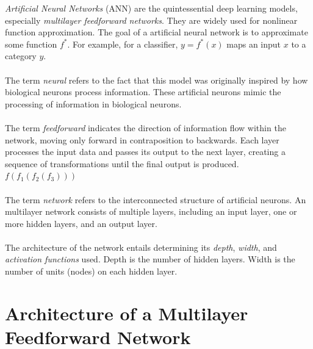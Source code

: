 \documentclass[../main.tex]{subfiles}
\begin{document}
	 
	 \noindent \textit{Artificial Neural Networks} (ANN) are the quintessential deep learning models, especially \textit{multilayer feedforward networks}. They are widely used for nonlinear function approximation. The goal of a artificial neural network is to approximate some function $f^*$. For example, for a classifier, $y = f^*(x)$ maps an input $x$ to a category $y$.  \\ \\ 
	 \noindent The term \textit{neural} refers  to the fact that this model was originally inspired by how biological neurons process information. These artificial neurons mimic the processing of information in biological neurons. \\ \\ 
	 \noindent The term \textit{feedforward} indicates the direction of information flow within the network, moving only forward in contraposition to backwards. Each layer processes the input data and passes its output to the next layer, creating a sequence of transformations until the final output is produced. $f(f_1(f_2(f_3)))$ \\ \\
	 \noindent The term \textit{network} refers to the interconnected structure of artificial neurons. An multilayer network consists of multiple layers, including an input layer, one or more hidden layers, and an output layer. \\ \\ %
	 \noindent The architecture of the network entails determining its \textit{depth}, \textit{width}, and \textit{activation functions} used. Depth is the number of hidden layers. Width is the number of units (nodes) on each hidden layer. 
	 
	 
	 \section{Architecture of a Multilayer Feedforward Network}
\end{document}

